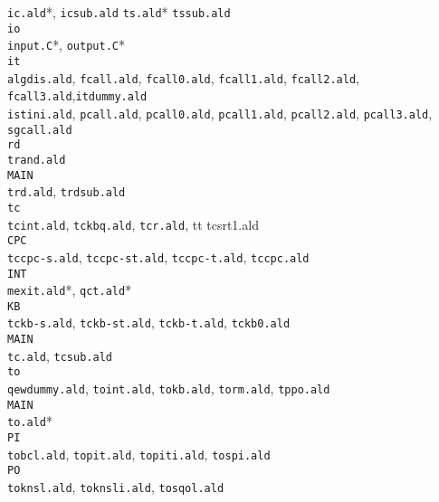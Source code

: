 {\begin{tabbing}
       {\tt ic.ald}*, {\tt icsub.ald}
       {\tt ts.ald}* {\tt tssub.ald} \- \- \\
  {\tt io} \+ \\
      {\tt input.C}*,
      {\tt output.C}* \- \\
  {\tt it}  \+ \\
      {\tt algdis.ald}, {\tt fcall.ald}, {\tt fcall0.ald}, {\tt fcall1.ald},
      {\tt fcall2.ald}, {\tt fcall3.ald},{\tt itdummy.ald} \\
      {\tt istini.ald}, {\tt pcall.ald}, {\tt pcall0.ald}, {\tt pcall1.ald}, 
      {\tt pcall2.ald}, {\tt pcall3.ald}, {\tt sgcall.ald}  \- \\
  {\tt rd} \+ \\
      {\tt trand.ald} \\
      {\tt MAIN} \+ \\
           {\tt trd.ald}, {\tt trdsub.ald} \- \- \\
  {\tt tc} \+ \\
       {\tt tcint.ald}, {\tt tckbq.ald}, {\tt tcr.ald}, {tt tcsrt1.ald} \\
       {\tt CPC} \+ \\
          {\tt tccpc-s.ald},
          {\tt tccpc-st.ald},
          {\tt tccpc-t.ald},
          {\tt tccpc.ald} \- \\
       {\tt INT} \+ \\
          {\tt mexit.ald}*,
          {\tt qct.ald}* \- \\
       {\tt KB} \+ \\
          {\tt tckb-s.ald},
          {\tt tckb-st.ald},
          {\tt tckb-t.ald},
          {\tt tckb0.ald} \- \\
       {\tt MAIN} \+ \\
          {\tt tc.ald}, {\tt tcsub.ald} \- \- \\
    {\tt to} \+ \\
    {\tt qewdummy.ald},
    {\tt toint.ald},
    {\tt tokb.ald},
    {\tt torm.ald},
    {\tt tppo.ald} \\
    {\tt MAIN} \+ \\
              {\tt to.ald}* \- \\
    {\tt PI} \+ \\
              {\tt tobcl.ald}, {\tt topit.ald}, {\tt topiti.ald}, 
              {\tt tospi.ald} \- \\
    {\tt PO} \+ \\
              {\tt toknsl.ald},
              {\tt toknsli.ald},
              {\tt tosqol.ald} \- \\

\end{tabbing}}
